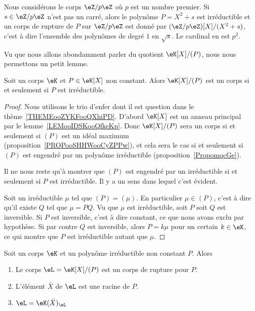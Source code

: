 \begin{example}
    Nous considérons le corps \( \eZ/p\eZ\) où \( p\) est un nombre premier. Si \( s\in \eZ/p\eZ\) n'est pas un carré, alors le polynôme \(P= X^2+s\) est irréductible et un corps de rupture de \( P\) sur \( \eZ/p\eZ\) est donné par \( (\eZ/p\eZ)[X]/(X^2+s)\), c'est à dire l'ensemble des polynômes de degré \( 1\) en \( \sqrt{s}\). Le cardinal en est \( p^2\).
\end{example}

Vu que nous allons abondamment parler du quotient \( \eK[X]/(P)\), nous nous permettons un petit lemme.
\begin{lemma}       \label{LEMooWYYFooXYacdF}
    Soit un corps \( \eK\) et \( P\in \eK[X]\) non constant. Alors \( \eK[X]/(P)\) est un corps si et seulement si \( P\) est irréductible.
\end{lemma}

\begin{proof}
    Nous utilisons le trio d'enfer dont il est question dans le thème~\ref{THEMEooZYKFooQXhiPD}. D'abord \( \eK[X]\) est un anneau principal par le lemme~\ref{LEMooIDSKooQfkeKp}. Donc \( \eK[X]/(P)\) sera un corps si et seulement si \( (P)\) est un idéal maximum (proposition~\ref{PROPooSHHWooCyZPPw}), et cela sera le cas si et seulement si \( (P)\) est engendré par un polynôme irréductible (proposition~\ref{PropomqcGe}).

    Il ne nous reste qu'à montrer que \( (P)\) est engendré par un irréductible si et seulement si \( P\) est irréductible. Il y a un sens dans lequel c'est évident.

    Soit un irréductible \( \mu\) tel que \( (P)=(\mu)\). En particulier \( \mu\in (P)\), c'est à dire qu'il existe \( Q\) tel que \( \mu=PQ\). Vu que \( \mu\) est irréductible, soit \( P\) soit \( Q\) est inversible. Si \( P\) est inversible, c'est à dire constant, ce que nous avons exclu par hypothèse. Si par contre \( Q\) est inversible, alors \( P=k\mu\) pour un certain \( k\in \eK\), ce qui montre que \( P\) est irréductible autant que \( \mu\).
\end{proof}

\begin{proposition}        \label{PROPooUBIIooGZQyeE}
    Soit un corps \( \eK\) et un polynôme irréductible non constant \( P\). Alors
    \begin{enumerate}
        \item
            Le corps \( \eL=\eK[X]/(P)\) est un corps de rupture pour \( P\).
        \item
            L'élément \( \bar X\) de \( \eL\) est une racine de \( P\).
        \item
            \( \eL=\eK(\bar X)_{\eL}\)
    \end{enumerate}
\end{proposition}

